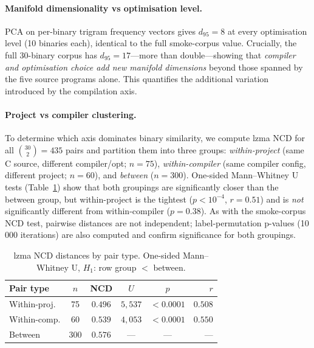 \documentclass[10pt,twocolumn]{article}
\begin{document}
\paragraph{Manifold dimensionality vs optimisation level.}
PCA on per-binary trigram frequency vectors gives $d_{95} = 8$ at every
optimisation level (10 binaries each), identical to the full smoke-corpus
value.  Crucially, the full 30-binary corpus has $d_{95} = 17$---more than
double---showing that \emph{compiler and optimisation choice add new manifold
dimensions} beyond those spanned by the five source programs alone.  This
quantifies the additional variation introduced by the compilation axis.

\paragraph{Project vs compiler clustering.}
To determine which axis dominates binary similarity, we compute lzma NCD
for all ${30 \choose 2} = 435$ pairs and partition them into three groups:
\emph{within-project} (same C source, different compiler/opt; $n=75$),
\emph{within-compiler} (same compiler config, different project; $n=60$),
and \emph{between} ($n=300$).  One-sided Mann--Whitney U tests (Table~\ref{tab:proj_vs_cc})
show that both groupings are significantly closer than the between group, but
within-project is the tightest ($p < 10^{-4}$, $r = 0.51$) and is
\emph{not} significantly different from within-compiler ($p = 0.38$).
As with the smoke-corpus NCD test, pairwise distances are not independent;
label-permutation p-values (10\,000 iterations) are also computed and
confirm significance for both groupings.

\begin{table}[h]
\centering
\caption{lzma NCD distances by pair type. One-sided Mann--Whitney U,
  $H_1$: row group $<$ between.}
\label{tab:proj_vs_cc}
\footnotesize
\begin{tabular}{@{}lccccr@{}}
\toprule
\textbf{Pair type} & $n$ & \textbf{NCD} & $U$ & $p$ & $r$ \\
\midrule
Within-proj.  & 75  & $0.496$ & $5{,}537$ & $<0.0001$ & $0.508$ \\
Within-comp.  & 60  & $0.539$ & $4{,}053$ & $<0.0001$ & $0.550$ \\
Between       & 300 & $0.576$ & ---        & ---       & ---    \\
\bottomrule
\end{tabular}
\end{table}
\end{document}
